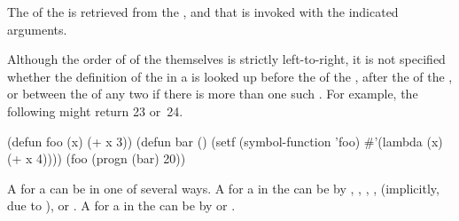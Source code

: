 The  of the  
is retrieved from the ,
and that  is invoked with the indicated arguments.


Although the order of  of 
the   themselves is 
strictly left-to-right, it is not specified whether 
the definition of the  in a  is looked up 
before the  of the  ,
after the  of the  ,
or between the  of any two   
if there is more than one such  .  
For example, the following might return 23 or~24.

\code
 (defun foo (x) (+ x 3))
 (defun bar () (setf (symbol-function 'foo) #'(lambda (x) (+ x 4))))
 (foo (progn (bar) 20))
\endcode
{}

A  for a  can be  in 
one of several ways.  A  for a  in 
the  can be  by 
 ,
 ,
 ,
 ,
  (implicitly, due to ),
or
 .
A  for a  in the 
can be  by
or .
%

